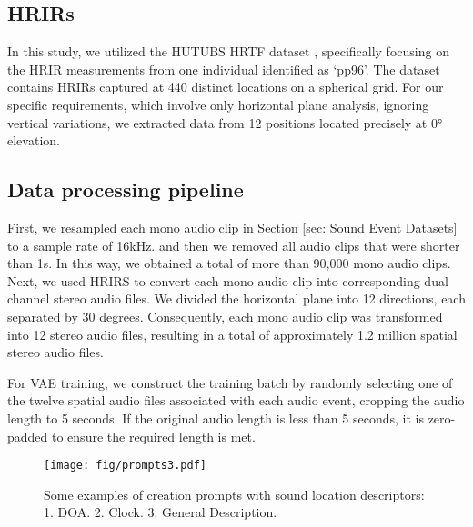 \documentclass{IEEEtran}
\begin{document}
\subsection{HRIRs}
In this study, we utilized the HUTUBS HRTF dataset \cite{brinkmann2019hutubs}, specifically focusing on the HRIR measurements from one individual identified as `pp96'.
The dataset contains HRIRs captured at 440 distinct locations on a spherical grid. For our specific requirements, which involve only horizontal plane analysis, ignoring vertical variations, we extracted data from 12 positions located precisely at 0° elevation.

\subsection{Data processing pipeline}
\label{subsec: Data Processing}
First, we resampled each mono audio clip in  Section \ref{sec: Sound Event Datasets} to a sample rate of 16kHz. and then we removed all audio clips that were shorter than 1s.
In this way, we obtained a total of more than 90,000 mono audio clips. Next, we used HRIRS to convert each mono audio clip into corresponding dual-channel stereo audio files. We divided the horizontal plane into 12 directions, each separated by 30 degrees. Consequently, each mono audio clip was transformed into 12 stereo audio files, resulting in a total of approximately 1.2 million spatial stereo audio files.

For VAE training, we construct the training batch by randomly selecting one of the twelve spatial audio files associated with each audio event, cropping the audio length to 5 seconds. If the original audio length is less than 5 seconds, it is zero-padded to ensure the required length is met.

\begin{figure}[t]
    \centering
    \texttt{[image: fig/prompts3.pdf]}
    \caption{Some examples of creation prompts with sound location descriptors: 1. DOA. 2. Clock. 3. General Description.}
    \label{fig:prompts}
\end{figure}
\end{document}
